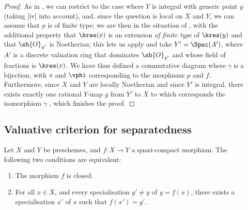 \begin{proof}
As in , we can restrict to the case where $Y$ is integral with generic point $y$ (taking [iv] into account), and, since the question is local on $X$ and $Y$, we can assume that $p$ is of finite type;
we are then in the situation of , with the additional property that $\kres(x)$ is an extension \emph{of finite type} of $\kres(y)$  and that $\sh{O}_{y'}$ is Noetherian;
this lets us apply  and take $Y'=\Spec(A')$, where $A'$ is a discrete valuation ring that dominates $\sh{O}_{y'}$ and whose field of fractions is $\kres(x)$.
We have thus defined a commutative diagram  where $\gamma$ is a bijection, with $\pi$ and $\vphi$ corresponding to the morphisms $p$ and $f$.
Furthermore, since $X$ and $Y$ are locally Noetherian  and since $Y'$ is integral, there exists exactly one rational $Y$-map $g$ from $Y'$ to $X$ to which corresponds the isomorphism $\gamma$ , which finishes the proof.
\end{proof}

\subsection{Valuative criterion for separatedness}
\label{subsection:II.7.2}

\begin{proposition}[7.2.1]
\label{II.7.2.1}
Let $X$ and $Y$ be preschemes, and $f:X\to Y$ a quasi-compact morphism.
The following two conditions are equivalent:
\begin{enumerate}
    \item[\rm{(a)}] The morphism $f$ is closed.
    \item[\rm{(b)}] For all $x\in X$, and every specialisation $y'\neq y$ of $y=f(x)$, there exists a specialisation $x'$ of $x$ such that $f(x')=y'$.
\end{enumerate}
\end{proposition}

